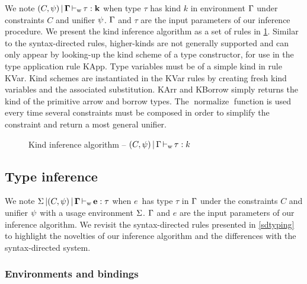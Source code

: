 We note $(C,\mathrm{\psi}) \operatorname{|} \bf{\Gamma} \operatorname{\vdash_w} \bf{\tau} : k$ when type $\tau$ has kind $k$
in environment $\Gamma$ under constraints $C$ and unifier $\mathrm{\psi}$.
$\Gamma$ and $\tau$ are the input parameters of
our inference procedure.
We present the kind inference algorithm as a set of rules in
\cref{rules:kinding}.
Similar to the syntax-directed rules, higher-kinds are not generally supported
and can only appear by looking-up the kind scheme of a type constructor,
for use in the type application rule {\sc KApp}.
Type variables must be of a simple kind in rule {\sc KVar}.
Kind schemes are instantiated in the {\sc KVar} rules by creating
fresh kind variables and the associated substitution.
{\sc KArr} and {\sc KBorrow} simply returns the kind of the primitive
arrow and borrow types.
The $\operatorname{normalize}$ function is used every time several constraints
must be composed in order to simplify the constraint and return a most general
unifier.

\begin{figure}[ht]
  \centering
  
  \caption{Kind inference algorithm -- $(C,\mathrm{\psi}) \operatorname{|} \Gamma \operatorname{\vdash_w} \tau : k$}
  \label{rules:kinding}
\end{figure}



\subsection{Type inference}

We note $\Sigma \operatorname{|} (C,\mathrm{\psi}) \operatorname{|} \bf{\Gamma} \operatorname{\vdash_w} \bf{e} : \tau$ when
$e$\ has type $\tau$ in $\Gamma$ under the constraints $C$ and unifier $\mathrm{\psi}$
with a usage environment $\Sigma$. $\Gamma$ and $e$ are the input parameters of our
inference algorithm.
We revisit the syntax-directed rules presented in \cref{sdtyping} to highlight the
novelties
of our inference algorithm and the differences with the syntax-directed
system.

\subsubsection{Environments and bindings}
\label{infer:envs}

